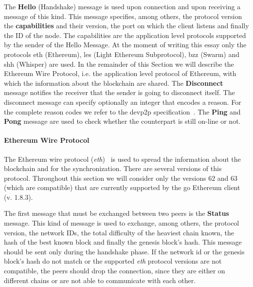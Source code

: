 The \textbf{Hello} (Handshake) message is used upon connection and upon
receiving a
message of this kind.
This message specifies, among others, the protocol version
the \textbf{capabilities} and their
version, the port on which the client listens and finally the ID of the node.
The capabilities are the application level protocols supported by the sender
of the Hello Message. At the moment of writing this essay only the protocols
eth (Ethereum), les (Light Ethereum Subprotocol), bzz (Swarm) and
shh (Whisper) are used. In the remainder of this
Section we will describe the Ethereum Wire Protocol, i.e. the application
level protocol of Ethereum, with which the information about the blockchain
are shared.
The \textbf{Disconnect} message notifies the receiver that the sender is going
to disconnect itself. The disconnect message can specify optionally an
integer that encodes a reason.
For the complete reason codes we refer to the devp2p specification~\cite{}.
The \textbf{Ping} and \textbf{Pong} message are used to check whether the
counterpart is still on-line or not.

\paragraph{Ethereum Wire Protocol}
The Ethereum wire protocol
(\textit{eth})~\cite{bib:ethereumwireprotocol} is used to spread the information
about the blockchain and for the synchronization. There are several versions
of this protocol. Throughout this section we will consider only the versions
$62$ and $63$ (which are compatible) that are currently supported by the go
Ethereum client (v. 1.8.3).

The first message that must be exchanged between two peers
is the \textbf{Status} message. This kind of message is used to exchange,
among others, the protocol version, the network IDs, the total difficulty of the
heaviest chain known, the hash of the best known block and
finally the genesis block's hash. This message should be sent only during
the handshake phase.
If the network id or the genesis block's hash do not match or the supported
\emph{eth} protocol versions are not compatible, the peers should drop
the connection, since they are either on different chains or are not able to
communicate with each other.




